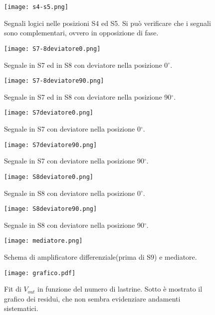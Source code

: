 \begin{figure}[h]
	\centering
	\texttt{[image: s4-s5.png]}
	\caption{Segnali logici nelle posizioni S4 ed S5. Si può verificare che i segnali sono complementari, ovvero in opposizione di fase.}
	\label{f:s4-s5}
\end{figure}

\begin{figure}[h]
	\centering
	\texttt{[image: S7-8deviatore0.png]}
	\caption{Segnale in S7 ed in S8 con deviatore nella posizione 0$^\circ$.}
	\label{f:S7-8deviatore0}
\end{figure}

\begin{figure}[h]
	\centering
	\texttt{[image: S7-8deviatore90.png]}
	\caption{Segnale in S7 ed in S8 con deviatore nella posizione 90$^\circ$.}
	\label{f:S7-8deviatore90}
\end{figure}

\begin{figure}[h]
	\centering
	\texttt{[image: S7deviatore0.png]}
	\caption{Segnale in S7 con deviatore nella posizione 0$^\circ$.}
	\label{f:S7deviatore0}
\end{figure}

\begin{figure}[h]
	\centering
	\texttt{[image: S7deviatore90.png]}
	\caption{Segnale in S7 con deviatore nella posizione 90$^\circ$.}
	\label{f:S7deviatore90}
\end{figure}

\begin{figure}[h]
	\centering
	\texttt{[image: S8deviatore0.png]}
	\caption{Segnale in S8 con deviatore nella posizione 0$^\circ$.}
	\label{f:S8deviatore0}
\end{figure}

\begin{figure}[h]
	\centering
	\texttt{[image: S8deviatore90.png]}
	\caption{Segnale in S8 con deviatore nella posizione 90$^\circ$.}
	\label{f:S8deviatore90}
\end{figure}

\begin{figure}[h]
	\centering
	\texttt{[image: mediatore.png]}
	\caption{Schema di amplificatore differenziale(prima di S9) e mediatore.}
	\label{f:Mediatore}
\end{figure}

\begin{figure}[h]
	\centering
	\texttt{[image: grafico.pdf]}
	\caption{Fit di $V_{out}$ in funzione del numero di lastrine. Sotto è mostrato il grafico dei residui, che non sembra evidenziare andamenti sistematici.}
	\label{f:Grafico}
\end{figure}